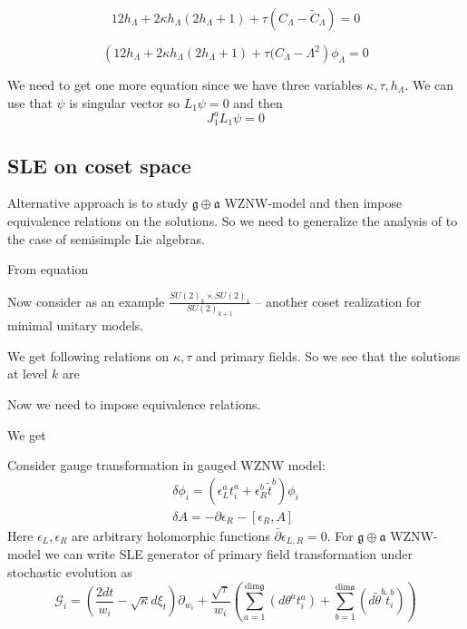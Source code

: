 \documentclass[a4paper]{jpconf}
\theoremstyle{definition}
\newcommand{\gf}{\mathfrak{g}}
\newcommand{\af}{\mathfrak{a}}
\theoremstyle{definition} \newtheorem{Def}{Definition}
\begin{document}
\begin{equation}
  \label{eq:17}
  12 h_{\Lambda}+2\kappa h_{\Lambda} (2h_{\Lambda}+1) +  \tau (C_{\Lambda}-\tilde{C}_{\Lambda})=0
\end{equation}

\begin{equation}
  \label{eq:16}
  \left(12 h_{\Lambda}+2\kappa h_{\Lambda} (2h_{\Lambda}+1) +  \tau (C_{\Lambda}-\Lambda^{2}\right) \phi_{\Lambda}=0
\end{equation}

We need to get one more equation since we have three variables $\kappa,\tau,h_{\Lambda}$. We can use that $\psi$ is singular vector so $L_{1}\psi=0$ and then
\begin{equation}
  \label{eq:18}
  J_{1}^{a}L_{1}\psi=0
\end{equation}



\subsection{SLE on coset space}
\label{sec:sle-coset-space}



Alternative approach is to study $\gf\oplus \af$ WZNW-model and then impose equivalence relations on the solutions. 
So we need to generalize the analysis of \cite{alekseev2010sle} to the case of semisimple Lie algebras. 

From equation 

Now consider as an example $\frac{SU(2)_{k}\times SU(2)_{1}}{SU(2)_{k+1}}$ -- another coset realization for minimal unitary models. 

We get following relations on $\kappa,\tau$ and primary fields. So we see that the solutions at level $k$ are 

Now we need to impose equivalence relations.


We get 


Consider gauge transformation in gauged WZNW model:
\begin{eqnarray*}
  \delta \phi_{i}=(\epsilon_{L}^{a} t^{a}_{i}+\epsilon^{b}_{R}\tilde{t}^{b})\phi_{i}\\
  \delta A = -\partial \epsilon_{R}-[\epsilon_{R},A]
\end{eqnarray*}
Here $\epsilon_{L}, \epsilon_{R}$ are arbitrary holomorphic functions $\bar\partial\epsilon_{L,R}=0$. 
For  $\gf\oplus \af$ WZNW-model we can write SLE generator of primary field transformation under stochastic evolution as
\begin{equation*}
  \mathcal{G}_{i}=\left(\frac{2dt}{w_{i}}-\sqrt{\kappa} d\xi_{t}\right) \partial_{w_{i}}+\frac{\sqrt{\tau}}{w_{i}}\left(\sum_{a=1}^{\mathrm{dim} \gf}\left(d \theta ^{a} t^{a}_{i}\right)+\sum_{b=1}^{\mathrm{dim} \af}\left(d \tilde{\theta} ^{b} \tilde{t}^{b}_{i}\right)\right)
\end{equation*}
\end{document}

